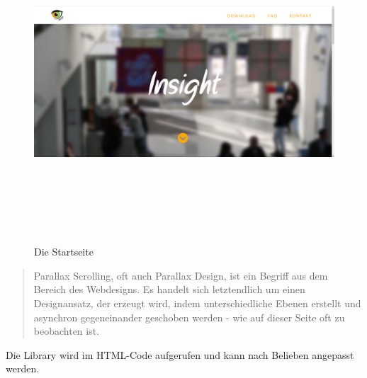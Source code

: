 \begin{figure}[H]
	\centering				\includegraphics[width=12cm,height=12cm,keepaspectratio]{webseite_abb5} 
	\caption{Die Startseite}
\end{figure}
\begin{quote}
Parallax Scrolling, oft auch Parallax Design, ist ein Begriff aus dem Bereich des Webdesigns. Es handelt sich letztendlich um einen Designansatz, der erzeugt wird, indem unterschiedliche Ebenen erstellt und asynchron gegeneinander geschoben werden - wie auf dieser Seite oft zu beobachten ist.
\end{quote}
Die Library wird im HTML-Code aufgerufen und kann nach Belieben angepasst werden.

